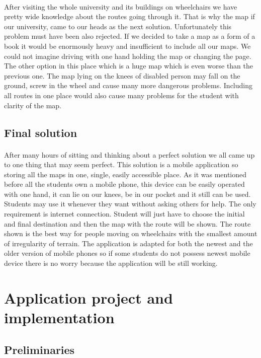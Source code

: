 \documentclass[12pt]{article}
\begin{document}
\paragraph{}After visiting the whole university and its buildings on wheelchairs we have pretty wide knowledge about the routes going through it. That is why the map if our university, came to our heads as the next solution. Unfortunately this problem must have been also rejected. If we decided to take a map as a form of a book it would be enormously heavy and insufficient to include all our maps. We could not imagine driving with one hand holding the map or changing the page. The other option in this place which is a huge map which is even worse than the previous one. The map lying on the knees of disabled person may fall on the ground, screw in the wheel and cause many more dangerous problems. Including all routes in one place would also cause many problems for the student with clarity of the map. 

\subsection{Final solution}
\paragraph{}After many hours of sitting and thinking about a perfect solution we all came up to one thing that may seem perfect. This solution is a mobile application so storing all the maps in one, single,  easily accessible place. As it was mentioned before all the students own a mobile phone, this device can be easily operated with one hand, it can lie on our knees, be in our pocket and it still can be used. Students may use it whenever they want without asking others for help. The only requirement is internet connection.  Student will just have to choose the initial and final destination and then the map with the route will be shown. The route shown is the best way for people moving on wheelchairs with the smallest amount of irregularity of terrain. The application is adapted for both the newest and the older version of mobile phones so if some students do not possess newest mobile device there is no worry because the application will be still working. 


\section{Application project and implementation}
\subsection{Preliminaries}
\end{document}
